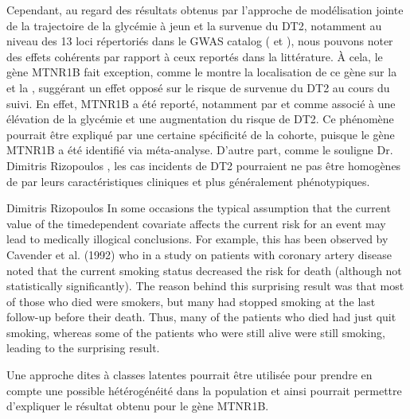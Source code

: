 \documentclass[11pt, a4paper]{article}
\begin{document}
\par{Cependant, au regard des résultats obtenus par l'approche de modélisation jointe de la trajectoire de la glycémie à jeun et la survenue du DT2,
notamment au niveau des 13 loci répertoriés dans le GWAS catalog \citep{welter_nhgri_2014} ( et ),
nous pouvons noter des effets cohérents par rapport à ceux reportés dans la littérature.
À cela, le gène MTNR1B fait exception, comme le montre la localisation de ce gène sur la  et la , suggérant un effet opposé sur le risque de survenue du DT2 au cours du suivi.
En effet, MTNR1B a été reporté, notamment par \citet{bouatia-naji_variant_2009} et \citet{lyssenko_common_2009} comme associé à une élévation de la glycémie et une augmentation du risque de DT2.
Ce phénomène pourrait être expliqué par une certaine spécificité de la cohorte, puisque le gène MTNR1B a été identifié via méta-analyse.
D'autre part, comme le souligne Dr. Dimitris Rizopoulos \citep{rizopoulos_joint_2012}, les cas incidents de DT2 pourraient ne pas être homogènes de par leurs caractéristiques cliniques et plus généralement phénotypiques.}
\newpage
\begin{bquote}{Dimitris Rizopoulos}
In some occasions the typical assumption that the current value of the timedependent covariate affects the current risk for an event may lead to medically
illogical conclusions. For example, this has been observed by Cavender et al. (1992) who in a study on patients with coronary artery disease noted that the
current smoking status decreased the risk for death (although not statistically significantly). The reason behind this surprising result was that most of those
who died were smokers, but many had stopped smoking at the last follow-up before their death. Thus, many of the patients who died had just quit smoking,
whereas some of the patients who were still alive were still smoking, leading to the surprising result.
\end{bquote}
\par{Une approche dites à classes latentes pourrait être utilisée \citep{proust-lima_joint_2009} pour prendre en compte une possible hétérogénéité dans la population et ainsi pourrait permettre d'expliquer le résultat obtenu pour le gène MTNR1B.}
\begin{table}[h]
    \begin{center}
        {\small}
        \label{tab:tab1}
    \end{center}
\end{table}
\end{document}
